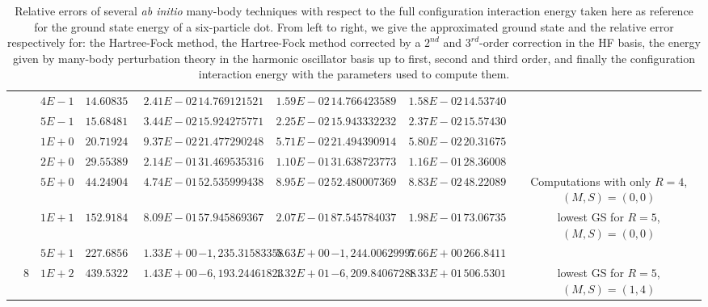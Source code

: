 \begin{landscape}
\begin{table}[ht]
{\begin{tabular}[c]{c|c|c|c|c|c|c|c|c|c|c}
& &$4E-1$ & $14.608357065775$ & $2.41E-02$ & $14.769121521097$ & $1.59E-02$ & $14.766423589843$ & $1.58E-02$ & $14.537409076271$ & \\
& &$5E-1$ & $15.684819018465$ & $3.44E-02$ & $15.924275771860$ & $2.25E-02$ & $15.943332232371$ & $2.37E-02$ & $15.574301411949$ & \\
& &$1E+0$ & $20.719248175282$ & $9.37E-02$ & $21.477290248615$ & $5.71E-02$ & $21.494390914709$ & $5.80E-02$ & $20.316754002510$ & \\
& &$2E+0$ & $29.553893712856$ & $2.14E-01$ & $31.469535316807$ & $1.10E-01$ & $31.638723773964$ & $1.16E-01$ & $28.360088424685$ & \\
& &$5E+0$ & $44.249048160124$ & $4.74E-01$ & $52.535999438849$ & $8.95E-02$ & $52.480007369626$ & $8.83E-02$ & $48.220896992378$ & \multirow{-20}{3cm}{Computations with only $R=4$, $(M,S)=(0,0)$}  \\ \cline{10-11}
& &$1E+1$ & $152.918469535500$ & $8.09E-01$ & $57.945869367135$ & $2.07E-01$ & $87.545784037730$ & $1.98E-01$ & $73.067354457427$  & lowest GS for $R=5$, $(M,S)=(0,0)$\\ \cline{10-11}
& &$5E+1$ & $227.685682577638$ & $1.33E+00$ & $-1,235.315833586860$ & $5.63E+00$ & $-1,244.006299979860$ & $5.66E+00$ & $266.841126091951$ & \\
& \multirow{-23}{*}{8} &$1E+2$ & $439.532217979911$ & $1.43E+00$ & $-6,193.244618230070$ & $1.32E+01$ & $-6,209.840672886840$ & $1.33E+01$ & $506.530170970484$ &  \multirow{-2}{3cm}{lowest GS for $R=5$, $(M,S)=(1,4)$}\\
\toprule[1pt]
\end{tabular}
}
 \caption{Relative errors of several \textit{ab initio} many-body techniques with respect to the full configuration interaction energy taken here as reference for the ground state energy of a six-particle dot. From left to right, we give the approximated ground state and the relative error respectively for: the Hartree-Fock method, the Hartree-Fock method corrected by a $2^{nd}$ and $3^{rd}$-order correction in the HF basis, the energy given by many-body perturbation theory in the harmonic oscillator basis up to first, second and third order, and finally the configuration interaction energy with the parameters used to compute them.}
\label{tab:comparisonMethods06ePT} 
\end{table} 
\end{landscape}



